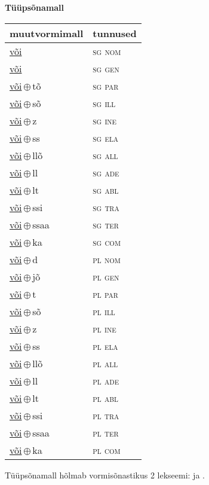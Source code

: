 

\vspace{3.5em}
\noindent \begin{minipage}{\textwidth}
\noindent \textbf{Tüüpsõnamall \,}\\

\begin{sideways}
\begin{tabular}{l l}
muutvormimall & tunnused \\
\hline
\underline{või} & \textsc{ sg nom } \\
\underline{või} & \textsc{ sg gen } \\
\underline{või}\,$\oplus$\,tõ & \textsc{ sg par } \\
\underline{või}\,$\oplus$\,sõ & \textsc{ sg ill } \\
\underline{või}\,$\oplus$\,z & \textsc{ sg ine } \\
\underline{või}\,$\oplus$\,ss & \textsc{ sg ela } \\
\underline{või}\,$\oplus$\,llõ & \textsc{ sg all } \\
\underline{või}\,$\oplus$\,ll & \textsc{ sg ade } \\
\underline{või}\,$\oplus$\,lt & \textsc{ sg abl } \\
\underline{või}\,$\oplus$\,ssi & \textsc{ sg tra } \\
\underline{või}\,$\oplus$\,ssaa & \textsc{ sg ter } \\
\underline{või}\,$\oplus$\,ka & \textsc{ sg com } \\
\underline{või}\,$\oplus$\,d & \textsc{ pl nom } \\
\underline{või}\,$\oplus$\,jõ & \textsc{ pl gen } \\
\underline{või}\,$\oplus$\,t & \textsc{ pl par } \\
\underline{või}\,$\oplus$\,sõ & \textsc{ pl ill } \\
\underline{või}\,$\oplus$\,z & \textsc{ pl ine } \\
\underline{või}\,$\oplus$\,ss & \textsc{ pl ela } \\
\underline{või}\,$\oplus$\,llõ & \textsc{ pl all } \\
\underline{või}\,$\oplus$\,ll & \textsc{ pl ade } \\
\underline{või}\,$\oplus$\,lt & \textsc{ pl abl } \\
\underline{või}\,$\oplus$\,ssi & \textsc{ pl tra } \\
\underline{või}\,$\oplus$\,ssaa & \textsc{ pl ter } \\
\underline{või}\,$\oplus$\,ka & \textsc{ pl com } \\
\end{tabular}
\end{sideways}
\label{tab:tüüpsõnamall-või}

\end{minipage}

 
\vspace{1em}
\noindent Tüüpsõnamall  hõlmab vormisõnastikus 2 lekseemi:  ja .
